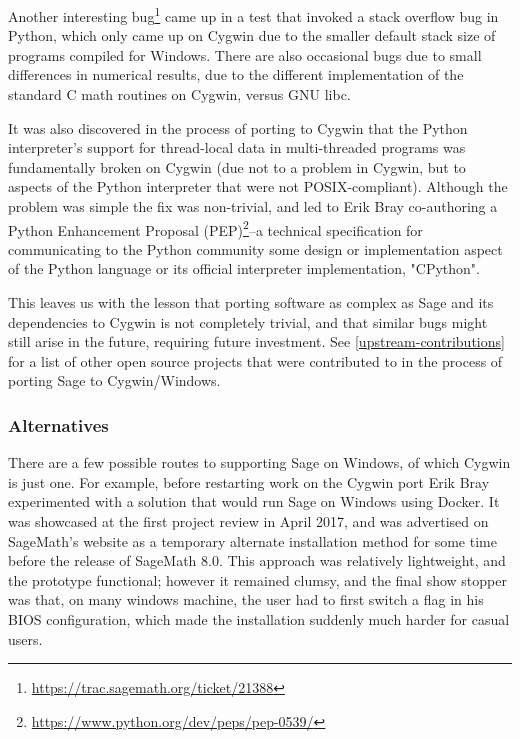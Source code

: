 Another interesting bug\footnote{\url{https://trac.sagemath.org/ticket/21388}}
came up in a test that invoked a stack overflow bug in Python, which only came
up on Cygwin due to the smaller default stack size of programs compiled for
Windows.  There are also occasional bugs due to small differences in numerical
results, due to the different implementation of the standard C math routines on
Cygwin, versus GNU libc.

It was also discovered in the process of porting to Cygwin that the Python
interpreter's support for thread-local data in multi-threaded programs was
fundamentally broken on Cygwin (due not to a problem in Cygwin, but to aspects
of the Python interpreter that were not POSIX-compliant).  Although the problem
was simple the fix was non-trivial, and led to Erik Bray co-authoring a Python
Enhancement Proposal
(PEP)\footnote{\url{https://www.python.org/dev/peps/pep-0539/}}--a technical
specification for communicating to the Python community some design or
implementation aspect of the Python language or its official interpreter
implementation, "CPython".

This leaves us with the lesson that porting software as complex as Sage and its
dependencies to Cygwin is not completely trivial, and that similar bugs might
still arise in the future, requiring future investment.  See
\ref{upstream-contributions} for a list of other open source projects that were
contributed to in the process of porting Sage to Cygwin/Windows.


\hypertarget{alternatives}{%
\subsubsection{Alternatives}\label{alternatives}}

There are a few possible routes to supporting Sage on Windows, of which
Cygwin is just one. For example, before restarting work on the Cygwin
port Erik Bray experimented with a solution that would run Sage on
Windows using Docker.
It was showcased at the first project review in
April 2017, and was advertised on SageMath's website as a temporary
alternate installation method for some time before the release of
SageMath 8.0.
This approach was relatively lightweight, and the prototype functional;
however it remained clumsy, and the final show stopper was that, on many
windows machine, the user had to first switch a flag in his BIOS
configuration, which made the installation suddenly much harder for
casual users.

